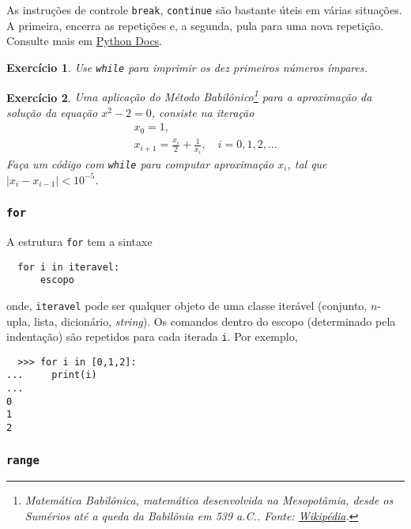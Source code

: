 \documentclass[12pt]{article}
\newtheorem{exr}{Exercício}[section]
\begin{document}
\begin{obs}
  As instruções de controle \lstinline+break+, \lstinline+continue+ são bastante úteis em várias situações. A primeira, encerra as repetições e, a segunda, pula para uma nova repetição. Consulte mais em \href{https://docs.python.org/3/tutorial/controlflow.html\#break-and-continue-statements-and-else-clauses-on-loops}{Python Docs}.
\end{obs}

\begin{exr}
  Use \lstinline+while+ para imprimir os dez primeiros números ímpares.
\end{exr}

\begin{exr}
  Uma aplicação do Método Babilônico\footnote{Matemática Babilônica, matemática desenvolvida na Mesopotâmia, desde os Sumérios até a queda da Babilônia em 539 a.C.. Fonte: \href{https://pt.wikipedia.org/wiki/Matem\%C3\%A1tica\_babil\%C3\%B4nica}{Wikipédia}.} para a aproximação da solução da equação $x^2-2 = 0$, consiste na iteração
  \begin{gather}
    x_0 = 1,\\
    x_{i+1} = \frac{x_i}{2} + \frac{1}{x_i},\quad i=0,1,2,\ldots
  \end{gather}
  Faça um código com \lstinline+while+ para computar aproximação $x_{i}$, tal que $|x_{i}-x_{i-1}|<10^{-5}$.
\end{exr}

\subsubsection{\lstinline+for+}

A estrutura \lstinline+for+ tem a sintaxe
\begin{lstlisting}
  for i in iteravel:
      escopo
\end{lstlisting}
onde, \lstinline+iteravel+ pode ser qualquer objeto de uma classe iterável (conjunto, $n$-upla, lista, dicionário, {\it string}). Os comandos dentro do escopo (determinado pela indentação) são repetidos para cada iterada \lstinline+i+. Por exemplo,
\begin{lstlisting}
  >>> for i in [0,1,2]:
...     print(i)
... 
0
1
2
\end{lstlisting}

\subsubsection{\lstinline+range+}
\end{document}
